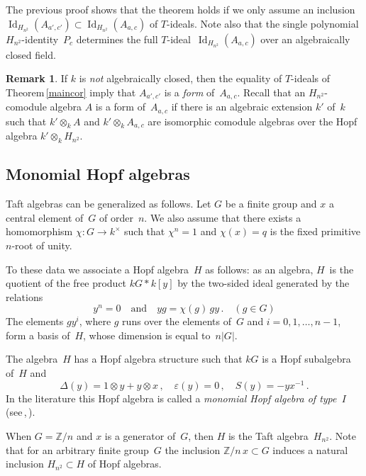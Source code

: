 \documentclass[11pt, a4paper]{amsart}
\theoremstyle{definition}
\newtheorem{rem}[theorem]{Remark}
\numberwithin{equation}{section}
\begin{document}
The previous proof shows that the theorem holds if we only assume
an inclusion $\operatorname{Id}_{H_{n^2}}(A_{a',c'}) \subset \operatorname{Id}_{H_{n^2}}(A_{a,c})$ of $T$-ideals.
Note also that the single polynomial $H_{n^2}$-identity~$P_c$
determines the full $T$-ideal~$\operatorname{Id}_{H_{n^2}}(A_{a,c})$ over an algebraically closed field.

\begin{rem}
If $k$ is \emph{not} algebraically closed, then the equality of $T$-ideals of Theorem\,\ref{maincor}
imply that $A_{a',c'}$ is a \emph{form} of~$A_{a,c}$.
Recall that an $H_{n^2}$-comodule algebra $A$ is a {form} of~$A_{a,c}$ if there is 
an algebraic extension $k'$ of~$k$ such that $k'\otimes_k A$ and $k'\otimes_k A_{a,c}$ 
are isomorphic comodule algebras over the Hopf algebra $k'\otimes_k H_{n^2}$.
\end{rem}

\subsection{Monomial Hopf algebras}\label{monomial}

Taft algebras can be generalized as follows. 
Let $G$ be a finite group and $x$ a central element of~$G$ of order~$n$.
We also assume that there exists a homomorphism $\chi: G \to k^{\times}$
such that $\chi^n = 1$ and $\chi(x) = q$ is the fixed primitive $n$-root of unity.

To these data we associate a Hopf algebra~$H$ as follows: as an algebra,
$H$~is the quotient of the free product $kG * k[y]$ by the two-sided ideal generated
by the relations
\begin{equation*}
y^n = 0
\quad\text{and}\quad
yg = \chi(g) \, gy \, . \quad (g\in G)
\end{equation*}
The elements $gy^i$, where $g$ runs over the elements of~$G$ and $i= 0, 1, \ldots, n-1$, form a basis
of~$H$, whose dimension is equal to~$n |G|$.

The algebra~$H$ has a Hopf algebra structure such that $kG$ is a Hopf subalgebra of~$H$
and
\begin{equation*}
\Delta(y) = 1 \otimes y + y \otimes x \, , \quad
{\varepsilon}(y) = 0 \, , \quad S(y) = - yx^{-1} \, .
\end{equation*}
In the literature this Hopf algebra is called a \emph{monomial Hopf algebra of type~$I$}
(see\,\cite[Sect.\,7]{BC},\,\cite{CHYZ}).

When $G = {\mathbb Z}/n$ and $x$ is a generator of~$G$, then $H$ is the Taft algebra~$H_{n^2}$.
Note that for an arbitrary finite group~$G$ the inclusion ${\mathbb Z}/n \, x \subset G$ induces 
a natural inclusion $H_{n^2} \subset H$ of Hopf algebras.
\end{document}

